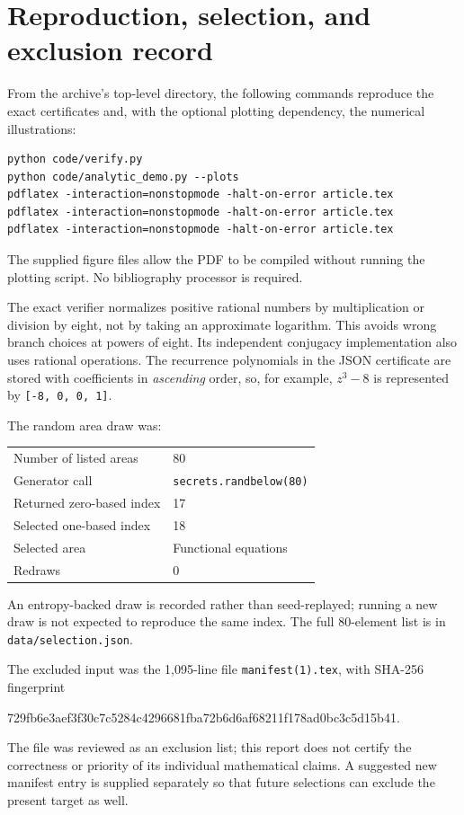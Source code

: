 \documentclass[11pt,letterpaper]{article}
\theoremstyle{definition}
\theoremstyle{remark}
\begin{document}
\section{Reproduction, selection, and exclusion record}
\label{app:reproduce}

From the archive's top-level directory, the following commands reproduce
the exact certificates and, with the optional plotting dependency, the
numerical illustrations:
\begin{lstlisting}
python code/verify.py
python code/analytic_demo.py --plots
pdflatex -interaction=nonstopmode -halt-on-error article.tex
pdflatex -interaction=nonstopmode -halt-on-error article.tex
pdflatex -interaction=nonstopmode -halt-on-error article.tex
\end{lstlisting}
The supplied figure files allow the PDF to be compiled without running
the plotting script. No bibliography processor is required.

The exact verifier normalizes positive rational numbers by multiplication
or division by eight, not by taking an approximate logarithm. This avoids
wrong branch choices at powers of eight. Its independent conjugacy
implementation also uses rational operations. The recurrence polynomials
in the JSON certificate are stored with coefficients in \emph{ascending}
order, so, for example, $z^3-8$ is represented by
\texttt{[-8, 0, 0, 1]}.

The random area draw was:
\begin{center}
\begin{tabular}{ll}
\toprule
Number of listed areas & 80\\
Generator call & \texttt{secrets.randbelow(80)}\\
Returned zero-based index & 17\\
Selected one-based index & 18\\
Selected area & Functional equations\\
Redraws & 0\\
\bottomrule
\end{tabular}
\end{center}
An entropy-backed draw is recorded rather than seed-replayed; running a
new draw is not expected to reproduce the same index. The full 80-element
list is in \texttt{data/selection.json}.

The excluded input was the 1,095-line file \texttt{manifest(1).tex}, with
SHA-256 fingerprint
\begin{center}
\small\ttfamily
729fb6e3aef3f30c7c5284c4296681fba72b6d6af68211f178ad0bc3c5d15b41.
\end{center}
The file was reviewed as an exclusion list; this report does not certify
the correctness or priority of its individual mathematical claims.
A suggested new manifest entry is supplied separately so that future
selections can exclude the present target as well.
\end{document}
